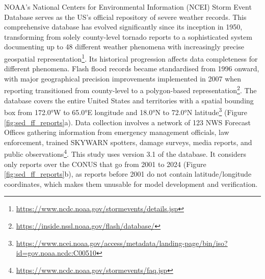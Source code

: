 NOAA's  National Centers for Environmental Information (NCEI) Storm Event Database serves as the US's official repository of severe weather records. This comprehensive database has evolved significantly since its inception in 1950, transforming from solely county-level tornado reports to a sophisticated system documenting up to 48 different weather phenomena with increasingly precise geospatial representation\footnote{\url{https://www.ncdc.noaa.gov/stormevents/details.jsp}}. Its historical progression affects data completeness for different phenomena. Flash flood records became standardised from 1996 onward, with major geographical precision improvements implemented in 2007 when reporting transitioned from county-level to a polygon-based representation\footnote{\url{https://inside.nssl.noaa.gov/flash/database/}}. The database covers the entire United States and territories with a spatial bounding box from 172.0°W to 65.0°E longitude and 18.0°N to 72.0°N latitude\footnote{\url{https://www.ncei.noaa.gov/access/metadata/landing-page/bin/iso?id=gov.noaa.ncdc:C00510}} (Figure \ref{fig:sed_ff_reports}a). Data collection involves a network of 123 NWS Forecast Offices gathering information from emergency management officials, law enforcement, trained SKYWARN spotters, damage surveys, media reports, and public observations\footnote{\url{https://www.ncdc.noaa.gov/stormevents/faq.jsp}}. This study uses version 3.1 of the database. It considers only reports over the CONUS that go from 2001 to 2024 (Figure \ref{fig:sed_ff_reports}b), as reports before 2001 do not contain latitude/longitude coordinates, which makes them unusable for model development and verification.

